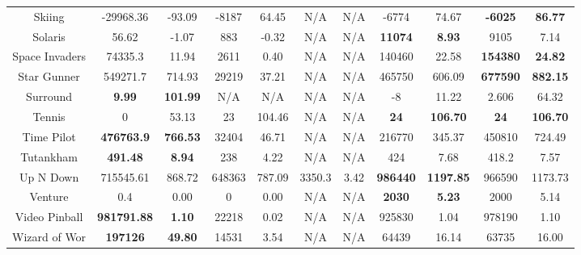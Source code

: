 \documentclass[nohyperref]{article}
\newcommand{\best}[1]{\textbf{#1}}
\theoremstyle{plain}
\begin{document}
\begin{table}[!hb]
\begin{center}
\begin{tabular}{| c |c c| c c| c c| c c| c c| }
 Skiing             & -29968.36      & -93.09      & -8187    &64.45          & N/A      & N/A     & -6774       & 74.67        &\textbf{-6025}	         &\textbf{86.77} \\
 Solaris            & 56.62                   & -1.07              & 883                &-0.32          & N/A               & N/A     & \best{11074}         & \best{8.93 } &9105            &7.14\\
 Space Invaders     & 74335.3                 & 11.94                 & 2611               &0.40       & N/A               & N/A     & 140460        & 22.58  &\textbf{154380}          &\textbf{24.82}   \\
 Star Gunner        & 549271.7       & 714.93     & 29219    &37.21          & N/A      & N/A     & 465750      & 606.09      &\textbf{677590}          &\textbf{882.15}\\
 Surround           & \textbf{9.99       }    & \textbf{101.99}     & N/A       &N/A         & N/A      & N/A     & -8          & 11.22         &2.606           &64.32 \\
 Tennis             & 0                       & 53.13      & 23        &104.46        & N/A      & N/A     & \textbf{24}          & \textbf{106.70} &\textbf{24}              &\textbf{106.70}      \\
 Time Pilot         & \textbf{476763.9}       & \textbf{766.53}         & 32404    &46.71         & N/A      & N/A     & 216770      & 345.37       &450810          &724.49   \\
 Tutankham          & \textbf{491.48     }    & \textbf{8.94}   & 238       &4.22         & N/A      & N/A     & 424         & 7.68                 &418.2           &7.57 \\
 Up N Down          & 715545.61               & 868.72            & 648363            &787.09        & 3350.3            & 3.42   & \best{986440}   & \best{1197.85} &966590          &1173.73    \\
 Venture            & 0.4                     & 0.00        & 0                  &0.00       & N/A               & N/A     & \best{2030}          & \best{5.23}      &2000            &5.14  \\
 Video Pinball      & \textbf{981791.88}      & \textbf{1.10}      & 22218    &0.02     & N/A      & N/A     & 925830      & 1.04                                    &978190          &1.10\\
 Wizard of Wor      & \textbf{197126         }& \textbf{49.80}      & 14531    &3.54     & N/A      & N/A     & 64439       & 16.14                                  &63735           &16.00\\

\end{tabular}
\end{center}
\end{table}
\end{document}
